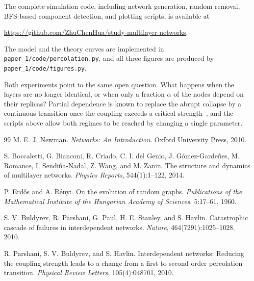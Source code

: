 \documentclass[11pt]{article}
\begin{document}
The complete simulation code, including network generation, random removal, BFS-based component detection, and plotting scripts, is available at
\begin{center}
  \url{https://github.com/ZhuChenHua/study-multilayer-networks}.
\end{center}
The model and the theory curves are implemented in \texttt{paper\_1/code/percolation.py}, and all three figures are produced by \texttt{paper\_1/code/figures.py}.

Both experiments point to the same open question. What happens when the layers are no longer identical, or when only a fraction $\alpha$ of the nodes depend on their replicas? Partial dependence is known to replace the abrupt collapse by a continuous transition once the coupling exceeds a critical strength~\cite{parshani2010}, and the scripts above allow both regimes to be reached by changing a single parameter.

\begin{thebibliography}{99}
  M. E. J. Newman.
  \newblock \emph{Networks: An Introduction}.
  \newblock Oxford University Press, 2010.

  S. Boccaletti, G. Bianconi, R. Criado, C. I. del Genio, J. G\'omez-Garde\~nes, M. Romance, I. Sendi\~na-Nadal, Z. Wang, and M. Zanin.
  \newblock The structure and dynamics of multilayer networks.
  \newblock \emph{Physics Reports}, 544(1):1--122, 2014.

  P. Erd\H{o}s and A. R\'enyi.
  \newblock On the evolution of random graphs.
  \newblock \emph{Publications of the Mathematical Institute of the Hungarian Academy of Sciences}, 5:17--61, 1960.

  S. V. Buldyrev, R. Parshani, G. Paul, H. E. Stanley, and S. Havlin.
  \newblock Catastrophic cascade of failures in interdependent networks.
  \newblock \emph{Nature}, 464(7291):1025--1028, 2010.

  R. Parshani, S. V. Buldyrev, and S. Havlin.
  \newblock Interdependent networks: Reducing the coupling strength leads to a change from a first to second order percolation transition.
  \newblock \emph{Physical Review Letters}, 105(4):048701, 2010.
\end{thebibliography}
\end{document}
